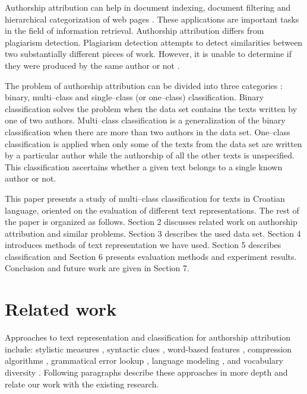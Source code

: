 \documentclass[11pt,english]{article}
\begin{document}
\begin{multicols}{2}
Authorship attribution can help in document indexing, document filtering and
hierarchical categorization of web pages \citep{luyckx2005shallow}. These
applications are important tasks in the field of information retrieval. 
Authorship attribution differs from plagiarism detection. Plagiarism detection
attempts to detect similarities between two substantially different pieces of
work. However, it is unable to determine if they were produced by the same author or not
\citep{de2001mining}.

The problem of authorship attribution can be divided into three categories \citep{zhao2005effective}: binary,
multi--class and single--class (or one--class) classification. Binary classification 
solves the problem when the data set contains the texts written by one of two authors. Multi--class 
classification is a generalization of the binary classification when there are 
more than two authors in the data set. One--class classification
is applied when only some of the texts from the data set are written by a particular
author while the authorship of all the other texts is unspecified. This
classification ascertains whether a given text belongs to a single known author or not.

This paper presents a study of multi--class classification for texts in Croatian
language, oriented on the evaluation of different text representations. The rest of
the paper is organized as follows. Section 2 discusses related work on authorship
attribution and similar problems. Section 3 describes the used data set. Section
4 introduces methods of text representation we have used. Section 5 describes
classification and Section 6 presents evaluation methods and experiment results.
Conclusion and future work are given in Section 7.

\section{Related work}
Approaches to text representation and classification for authorship attribution
include: stylistic measures \citep{coyotl2006authorship}, syntactic clues
\citep{stamatatos2001computer,uzuner2005comparative}, word-based features
\citep{argamon2005measuring,uzuner2005comparative}, compression algorithms
\citep{kukushkina2001using,zhao2005effective}, grammatical error lookup
\citep{koppel2003exploiting}, language modeling
\citep{peng2003language,coyotl2006authorship}, and vocabulary diversity
\citep{stamatatos2001computer}. Following paragraphs describe these approaches in
more depth and relate our work with the existing research.


\end{multicols}
\end{document}
